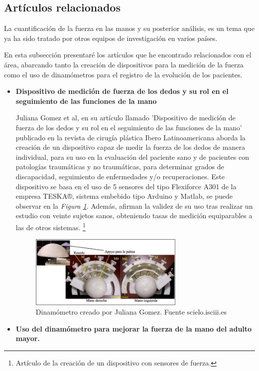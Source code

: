 \subsection{Artículos relacionados}
La cuantificación de la fuerza en las manos  y su posterior análisis, es un tema que ya ha sido tratado por otros equipos de investigación en varios países. 

En esta subsección presentaré los artículos que he encontrado relacionados con el área, abarcando tanto la creación de dispositivos para la medición de la fuerza como el uso de dinamómetros para el registro de la evolución de los pacientes.
\begin{itemize}
    \item \textbf{Dispositivo de medición de fuerza de los dedos y su
rol en el seguimiento de las funciones de la mano}

Juliana Gomez et al, en su artículo llamado 'Dispositivo de medición de fuerza de los dedos y su rol en el seguimiento de las funciones de la mano' publicado en la revista de cirugía plástica Ibero Latinoamericana aborda la creación de un dispositivo capaz de medir la fuerza de los dedos de manera individual, para su uso en la evaluación del paciente sano y de pacientes con patologías traumáticas y no traumáticas, para determinar grados de discapacidad, seguimiento de enfermedades y/o recuperaciones. 
Este dispositivo se basa en el uso de 5 sensores del tipo Flexiforce A301 de la empresa TESKA®, sistema embebido
tipo Arduino y Matlab, se puede observar en la \textit{Figura \ref{fig:Dinamómetro creado por Juliana Gomez}}. Además, afirman la validez de su uso tras realizar un estudio con veinte sujetos sanos, obteniendo tasas de medición equiparables a las de otros sistemas. \cite{GOMEZ2022}\footnote{Artículo de la creación de un dispositivo con sensores de fuerza\cite{GOMEZ2022}.}
    \begin{figure}[h]
        \centering
        \includegraphics[width=0.7\textwidth]{img/dispositivo Revista.jpg}
        \caption{Dinamómetro creado por Juliana Gomez. Fuente scielo.isciii.es}
        \label{fig:Dinamómetro creado por Juliana Gomez}
    \end{figure}
\item \textbf{Uso del dinamómetro para mejorar la fuerza de la mano del adulto mayor.}
    

\end{itemize}
